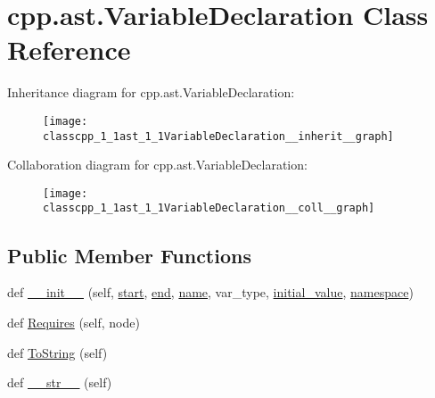 \hypertarget{classcpp_1_1ast_1_1VariableDeclaration}{}\section{cpp.\+ast.\+Variable\+Declaration Class Reference}
\label{classcpp_1_1ast_1_1VariableDeclaration}


Inheritance diagram for cpp.\+ast.\+Variable\+Declaration\+:\nopagebreak
\begin{figure}[H]
\begin{center}
\leavevmode
\texttt{[image: classcpp\_1\_1ast\_1\_1VariableDeclaration\_\_inherit\_\_graph]}
\end{center}
\end{figure}


Collaboration diagram for cpp.\+ast.\+Variable\+Declaration\+:\nopagebreak
\begin{figure}[H]
\begin{center}
\leavevmode
\texttt{[image: classcpp\_1\_1ast\_1\_1VariableDeclaration\_\_coll\_\_graph]}
\end{center}
\end{figure}
\subsection*{Public Member Functions}
\begin{DoxyCompactItemize}
\item 
def \hyperlink{classcpp_1_1ast_1_1VariableDeclaration_adc19909b6a3b2c2978b02044634fc13f}{\+\_\+\+\_\+init\+\_\+\+\_\+} (self, \hyperlink{classcpp_1_1ast_1_1Node_a7b2aa97e6a049bb1a93aea48c48f1f44}{start}, \hyperlink{classcpp_1_1ast_1_1Node_a3c5e5246ccf619df28eca02e29d69647}{end}, \hyperlink{classcpp_1_1ast_1_1__GenericDeclaration_af774f4729dfd78d0538a6782fe8514c1}{name}, var\+\_\+type, \hyperlink{classcpp_1_1ast_1_1VariableDeclaration_a7c259ca42a06e264679e8ab66e7ea374}{initial\+\_\+value}, \hyperlink{classcpp_1_1ast_1_1__GenericDeclaration_a8aee3f11b37449d54b42a78e0a689f46}{namespace})
\item 
def \hyperlink{classcpp_1_1ast_1_1VariableDeclaration_aaa1cae7cf191e6d561d861cd053a0bf4}{Requires} (self, node)
\item 
def \hyperlink{classcpp_1_1ast_1_1VariableDeclaration_a047aa4afddf7b7823a4095cea9477a21}{To\+String} (self)
\item 
def \hyperlink{classcpp_1_1ast_1_1VariableDeclaration_a9f5c15731d1bdd8fe14c2a575e2f4fe6}{\+\_\+\+\_\+str\+\_\+\+\_\+} (self)
\end{DoxyCompactItemize}
